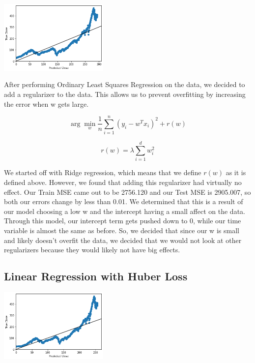 \documentclass[final,5p,times,twocolumn,authoryear, 12pt]{elsarticle}
\begin{document}
\includegraphics[width=0.4\textwidth, angle=0]{linregRR.png}

After performing Ordinary Least Squares Regression on the data, we decided to add a regularizer to the data. This allows us to prevent overfitting by increasing the error when w gets large.


\begin{adjustwidth}{1cm}{}
    \[ \arg \min_w \frac{1}{n} \sum_{i = 1}^{n} (y_i - w^T x_i)^2 + r(w)\]
\end{adjustwidth}

\begin{adjustwidth}{2.1cm}{}
        \[r(w) = \lambda\sum_{i=1}^d w_i^2\]

\end{adjustwidth}

We started off with Ridge regression, which means that we define $r(w)$ as it is defined above. However, we found that adding this regularizer had virtually no effect. Our Train MSE came out to be 2756.120 and our Test MSE is 2905.007, so both our errors change by less than 0.01. We determined that this is a result of our model choosing a low w and the intercept having a small affect on the data. Through this model, our intercept term gets pushed down to 0, while our time variable is almost the same as before. So, we decided that since our w is small and likely doesn't overfit the data, we decided that we would not look at other regularizers because they would likely not have big effects.

\subsection{Linear Regression with Huber Loss}

\includegraphics[width=0.4\textwidth, angle=0]{linregHuber.png}
\end{document}
